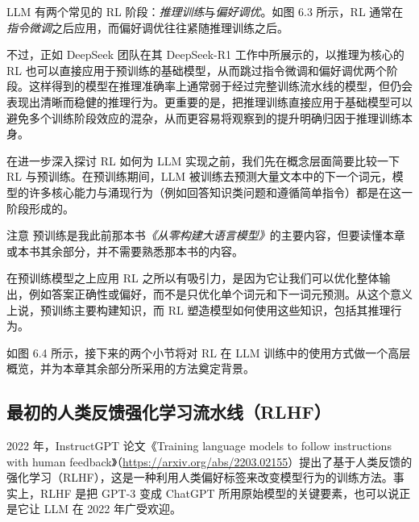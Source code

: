 
LLM 有两个常见的 RL 阶段：\emph{推理训练}与\emph{偏好调优}。如图 6.3 所示，RL 通常在\emph{指令微调}之后应用，而偏好调优往往紧随推理训练之后。

不过，正如 DeepSeek 团队在其 DeepSeek-R1 工作中所展示的，以推理为核心的 RL 也可以直接应用于预训练的基础模型，从而跳过指令微调和偏好调优两个阶段。这样得到的模型在推理准确率上通常弱于经过完整训练流水线的模型，但仍会表现出清晰而稳健的推理行为。更重要的是，把推理训练直接应用于基础模型可以避免多个训练阶段效应的混杂，从而更容易将观察到的提升明确归因于推理训练本身。

在进一步深入探讨 RL 如何为 LLM 实现之前，我们先在概念层面简要比较一下 RL 与预训练。在预训练期间，LLM 被训练去预测大量文本中的下一个词元，模型的许多核心能力与涌现行为（例如回答知识类问题和遵循简单指令）都是在这一阶段形成的。

\begin{myWarning}{注意}
 预训练是我此前那本书\emph{《从零构建大语言模型》}的主要内容，但要读懂本章或本书其余部分，并不需要熟悉那本书的内容。\end{myWarning}

在预训练模型之上应用 RL 之所以有吸引力，是因为它让我们可以优化整体输出，例如答案正确性或偏好，而不是只优化单个词元和下一词元预测。从这个意义上说，预训练主要构建知识，而 RL 塑造模型如何使用这些知识，包括其推理行为。

如图 6.4 所示，接下来的两个小节将对 RL 在 LLM 训练中的使用方式做一个高层概览，并为本章其余部分所采用的方法奠定背景。


\subsection{最初的人类反馈强化学习流水线（RLHF）}

2022 年，InstructGPT 论文《Training language models to follow instructions with human feedback》（\href{https://arxiv.org/abs/2203.02155}{https://arxiv.org/abs/2203.02155}）提出了基于人类反馈的强化学习（RLHF），这是一种利用人类偏好标签来改变模型行为的训练方法。事实上，RLHF 是把 GPT-3 变成 ChatGPT 所用原始模型的关键要素，也可以说正是它让 LLM 在 2022 年广受欢迎。

